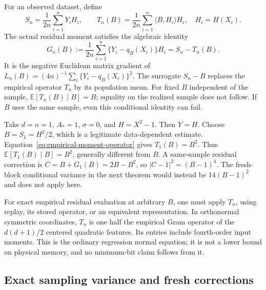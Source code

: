 For an observed dataset, define
\begin{equation}
 S_n=\frac1{2n}\sum_{i=1}^nY_iH_i,
 \qquad
 T_n(B)=\frac1{2n}\sum_{i=1}^n\langle B,H_i\rangle H_i,
 \quad H_i=H(X_i).
 \label{eq:empirical-moment-operator}
\end{equation}
The actual residual moment satisfies the algebraic identity
\begin{equation}
 G_n(B):=\frac1{2n}\sum_{i=1}^n
       \{Y_i-q_B(X_i)\}H_i=S_n-T_n(B).
 \label{eq:actual-residual}
\end{equation}
It is the negative Euclidean matrix gradient of
$L_n(B)=(4n)^{-1}\sum_i\{Y_i-q_B(X_i)\}^2$.
The surrogate $S_n-B$ replaces the empirical operator $T_n$ by its
population mean. For fixed $B$ independent of the sample,
$\mathbb E[T_n(B)\mid B]=B$; equality on the realized sample does not
follow. If $B$ uses the same sample, even this conditional identity can
fail.

\begin{remark}
\label{rem:adaptive-counterexample}
Take $d=n=1$, $A_*=1$, $\sigma=0$, and $H=X^2-1$. Then $Y=H$.
Choose $B=S_1=H^2/2$, which is a legitimate data-dependent estimate.
Equation~\eqref{eq:empirical-moment-operator} gives $T_1(B)=B^2$.
Thus $\mathbb E[T_1(B)\mid B]=B^2$, generally different from $B$.
A same-sample residual correction is $C=B+G_1(B)=2B-B^2$, so
$|C-1|^2=(B-1)^4$. The fresh-block conditional variance in the next
theorem would instead be $14(B-1)^2$ and does not apply here.
\end{remark}

For exact empirical residual evaluation at arbitrary $B$, one must apply
$T_n$, using replay, its stored operator, or an equivalent representation.
In orthonormal symmetric coordinates, $T_n$ is one half the empirical
Gram operator of the $d(d+1)/2$ centered quadratic features. Its entries
include fourth-order input moments. This is the ordinary regression
normal equation; it is not a lower bound on physical memory, and no
minimum-bit claim follows from it.

\subsection{Exact sampling variance and fresh corrections}


